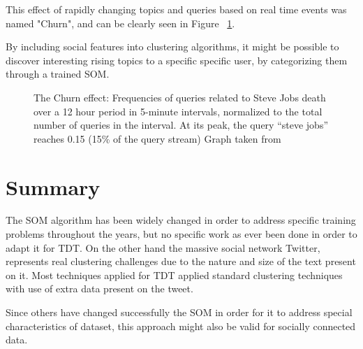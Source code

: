 This effect of rapidly changing topics and queries based on real time events was named "Churn", and can be clearly seen in Figure ~\ref{fig:churn}.

By including social features into clustering algorithms, it might be possible to discover interesting rising topics to a specific specific user, by categorizing them through a trained \ac{SOM}.

\begin{figure}[tb]
  \begin{center}
    \noindent{}
  \end{center}
  \caption{The Churn effect: Frequencies of queries related to Steve Jobs death over a 12 hour period in 5-minute intervals, normalized to the total number of queries in the interval. At its peak, the query “steve jobs” reaches 0.15 (15\% of the query stream) Graph taken from~\cite{Lin2012}}
  \label{fig:churn}
\end{figure}


\section{Summary}
The \ac{SOM} algorithm has been widely changed in order to address specific training problems throughout the years, but no specific work as ever been done in order to adapt it for \ac{TDT}. On the other hand the massive social network Twitter, represents real clustering challenges due to the nature and size of the text present on it. Most techniques applied for \ac{TDT} applied standard clustering techniques with use of extra data present on the tweet.

Since others have changed successfully the \ac{SOM} in order for it to address special characteristics of dataset, this approach might also be valid for socially connected data.
\cleardoublepage 
